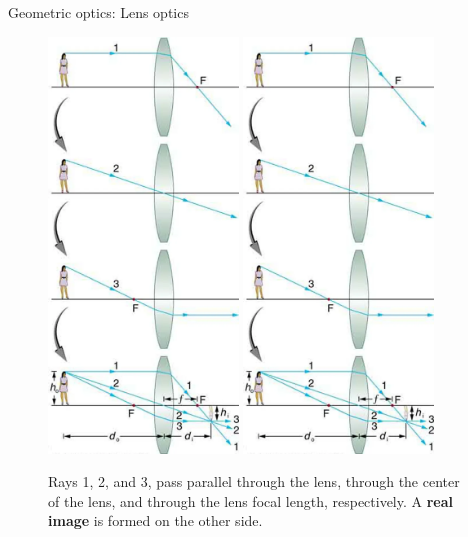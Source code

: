 \documentclass{beamer}
\begin{document}
\begin{frame}{Geometric optics: Lens optics}
\begin{figure}
\centering
\includegraphics[width=0.45\textwidth,trim=0cm 26cm 0cm 0cm,clip=true]{figures/thin_lens.png}
\includegraphics[width=0.45\textwidth,trim=0cm 0cm 0cm 26cm,clip=true]{figures/thin_lens.png}
\caption{\label{fig:lens2} \small Rays 1, 2, and 3, pass parallel through the lens, through the center of the lens, and through the lens focal length, respectively.  A \textbf{real image} is formed on the other side.}
\end{figure}
\end{frame}
\end{document}
